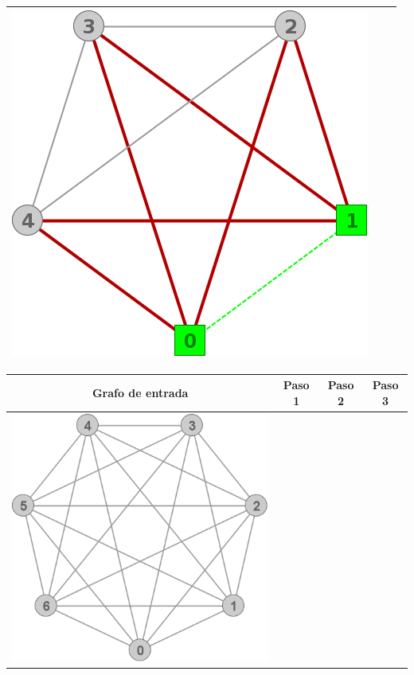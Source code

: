 \begin{center}
\begin{tabular}{ |c||c||c| }
			\includegraphics[scale = 0.3]{img/ej3/constructiva_golosa/K5_st2.png} \\
			\hline
		  \end{tabular}
		  \begin{tabular}{ |c||c||c||c| }
			\hline
			Grafo de entrada & Paso 1 & Paso 2 & Paso 3 \\
			\hline\hline
			\includegraphics[scale = 0.25]{img/ej3/constructiva_golosa/K7_st0.png} &

\end{tabular}
\end{center}
